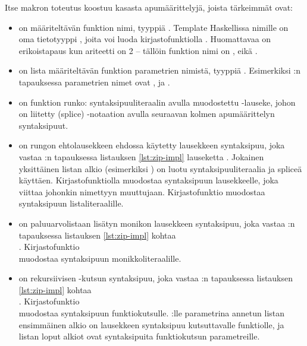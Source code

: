 Itse makron toteutus koostuu kasasta apumäärittelyjä, joista tärkeimmät ovat:
\begin{itemize}
    \item {} on määriteltävän funktion nimi, tyyppiä .
          Template Haskellissa nimille on oma tietotyyppi ,
          joita voi luoda kirjastofunktiolla .
          Huomattavaa on erikoistapaus kun ariteetti on 2 -- tällöin funktion nimi on ,
          eikä .

    \item {} on lista määriteltävän funktion parametrien nimistä, tyyppiä \Haskell{[Name]}.
          Esimerkiksi :n tapauksessa parametrien nimet ovat ,  ja .

    \item {} on funktion runko: syntaksipuuliteraalin avulla muodostettu -lauseke,
          johon on liitetty (splice) \Haskell{\$()}-notaation avulla seuraavan kolmen apumäärittelyn syntaksipuut.

    \item {} on rungon ehtolausekkeen ehdossa käytetty lausekkeen syntaksipuu,
          joka vastaa :n tapauksessa listauksen \ref{lst:zip-impl} lauseketta .
          Jokainen yksittäinen listan alkio (esimerkiksi ) on luotu syntaksipuuliteraalia
          ja spliceä käyttäen.
          Kirjastofunktiolla  muodostaa syntaksipuun lausekkeelle, joka
          viittaa johonkin nimettyyn muuttujaan.
          Kirjastofunktio  muodostaa syntaksipuun listaliteraalille.

    \item {} on paluuarvolistaan lisätyn monikon lausekkeen syntaksipuu,
          joka vastaa :n tapauksessa listauksen \ref{lst:zip-impl} kohtaa \\ .
          Kirjastofunktio  \\  muodostaa syntaksipuun monikkoliteraalille.

    \item {} on rekursiivisen -kutsun syntaksipuu,
          joka vastaa :n tapauksessa listauksen \ref{lst:zip-impl} kohtaa \\ .
          Kirjastofunktio  \\  muodostaa syntaksipuun funktiokutsulle.
          :lle parametrina annetun listan ensimmäinen alkio on lausekkeen syntaksipuu kutsuttavalle funktiolle,
          ja listan loput alkiot ovat syntaksipuita funktiokutsun parametreille.
\end{itemize}

